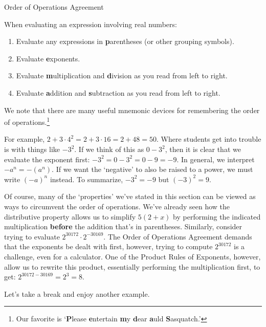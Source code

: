\begin{floatbox}[label=box:orderofoperations]{Order of Operations Agreement}

When evaluating an expression involving real numbers:

\begin{enumerate}

\item  Evaluate any expressions in \textbf{p}arentheses (or other grouping symbols).
\item  Evaluate \textbf{e}xponents.
\item  Evaluate \textbf{m}ultiplication and \textbf{d}ivision as you read from left to right.
\item  Evaluate \textbf{a}ddition and \textbf{s}ubtraction as you read from left to right.

\end{enumerate}

We note that there are many useful mnemonic devices for remembering the order of operations.\footnote{Our favorite is  `\textbf{P}lease \textbf{e}ntertain \textbf{m}y \textbf{d}ear \textbf{a}uld \textbf{S}asquatch.'}  

\end{floatbox}

For example, $2 + 3\cdot 4^2 = 2 + 3\cdot 16 = 2 + 48 = 50$.  Where students get into trouble is with things like $-3^2$.  If we think of this as $0 - 3^2$, then it is clear that we evaluate the exponent first:  $-3^2 =0 -3^2 =0 -9 = -9$.  In general, we interpret $-a^n = -\left(a^n\right)$.  If we want the `negative' to also be raised to a power, we must  write $(-a)^n$ instead.  To summarize, $-3^2 = -9$ but $(-3)^2  = 9$. 

Of course, many of the `properties' we've stated in this section can be viewed as ways to circumvent the order of operations. We've already seen how the distributive property allows us to simplify $5(2+x)$ by performing the indicated multiplication \textbf{before} the addition that's in parentheses.  Similarly, consider trying to evaluate $2^{30172}\cdot 2^{-30169}$.  The Order of Operations Agreement demands that the exponents be dealt with first, however, trying to compute $2^{30172}$ is a challenge, even for a calculator.  One of the Product Rules of Exponents, however, allow us to rewrite this product, essentially performing the multiplication first, to get:  $2^{30172-30169} = 2^{3} = 8$.  

Let's take a break and enjoy another example.

